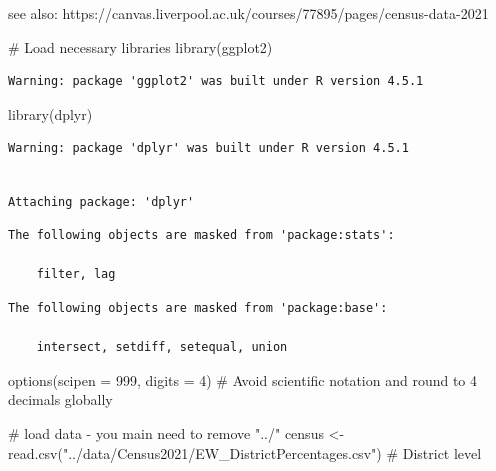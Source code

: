 \documentclass[
  letterpaper,
  DIV=11,
  numbers=noendperiod]{scrreprt}
\newenvironment{Shaded}{\begin{snugshade}}{\end{snugshade}}
\newcommand{\AttributeTok}[1]{\textcolor[rgb]{0.40,0.45,0.13}{#1}}
\newcommand{\CommentTok}[1]{\textcolor[rgb]{0.37,0.37,0.37}{#1}}
\newcommand{\DecValTok}[1]{\textcolor[rgb]{0.68,0.00,0.00}{#1}}
\newcommand{\FunctionTok}[1]{\textcolor[rgb]{0.28,0.35,0.67}{#1}}
\newcommand{\NormalTok}[1]{\textcolor[rgb]{0.00,0.23,0.31}{#1}}
\newcommand{\OtherTok}[1]{\textcolor[rgb]{0.00,0.23,0.31}{#1}}
\newcommand{\StringTok}[1]{\textcolor[rgb]{0.13,0.47,0.30}{#1}}
\begin{document}
see also:
https://canvas.liverpool.ac.uk/courses/77895/pages/census-data-2021

\begin{Shaded}
\begin{Highlighting}[]
\CommentTok{\# Load necessary libraries }
\FunctionTok{library}\NormalTok{(ggplot2) }
\end{Highlighting}
\end{Shaded}

\begin{verbatim}
Warning: package 'ggplot2' was built under R version 4.5.1
\end{verbatim}

\begin{Shaded}
\begin{Highlighting}[]
\FunctionTok{library}\NormalTok{(dplyr) }
\end{Highlighting}
\end{Shaded}

\begin{verbatim}
Warning: package 'dplyr' was built under R version 4.5.1
\end{verbatim}

\begin{verbatim}

Attaching package: 'dplyr'
\end{verbatim}

\begin{verbatim}
The following objects are masked from 'package:stats':

    filter, lag
\end{verbatim}

\begin{verbatim}
The following objects are masked from 'package:base':

    intersect, setdiff, setequal, union
\end{verbatim}

\begin{Shaded}
\begin{Highlighting}[]
\FunctionTok{options}\NormalTok{(}\AttributeTok{scipen =} \DecValTok{999}\NormalTok{, }\AttributeTok{digits =} \DecValTok{4}\NormalTok{)  }\CommentTok{\# Avoid scientific notation and round to 4 decimals globally}

\CommentTok{\# load data {-} you main need to remove "../"}
\NormalTok{census }\OtherTok{\textless{}{-}} \FunctionTok{read.csv}\NormalTok{(}\StringTok{"../data/Census2021/EW\_DistrictPercentages.csv"}\NormalTok{) }\CommentTok{\# District level}
\end{Highlighting}
\end{Shaded}
\end{document}
